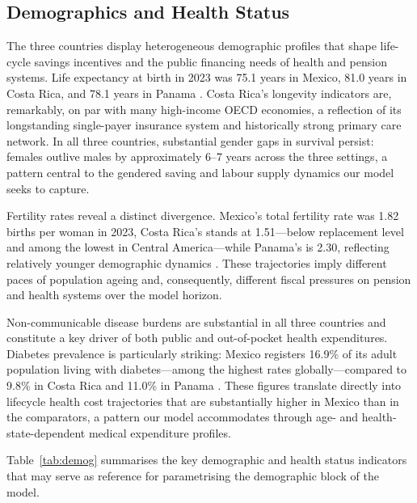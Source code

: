 \documentclass[12pt,a4paper]{article}
\begin{document}
\subsection{Demographics and Health Status}\label{subsec:demog}

The three countries display heterogeneous demographic profiles that
shape life-cycle savings incentives and the public financing needs of
health and pension systems. Life expectancy at birth in 2023 was 75.1
years in Mexico, 81.0 years in Costa Rica, and 78.1 years in Panama
\citep{PAHOHIA2024, WHOGHO2024}. Costa Rica's longevity indicators are,
remarkably, on par with many high-income OECD economies, a reflection
of its longstanding single-payer insurance system and historically
strong primary care network. In all three countries, substantial gender
gaps in survival persist: females outlive males by approximately 6--7
years across the three settings, a pattern central to the gendered
saving and labour supply dynamics our model seeks to capture.

Fertility rates reveal a distinct divergence. Mexico's total fertility
rate was 1.82 births per woman in 2023, Costa Rica's stands at
1.51---below replacement level and among the lowest in Central
America---while Panama's is 2.30, reflecting relatively younger
demographic dynamics \citep{WorldBankWDI2024}. These trajectories imply
different paces of population ageing and, consequently, different
fiscal pressures on pension and health systems over the model horizon.

Non-communicable disease burdens are substantial in all three countries
and constitute a key driver of both public and out-of-pocket health
expenditures. Diabetes prevalence is particularly striking: Mexico
registers 16.9\% of its adult population living with diabetes---among
the highest rates globally---compared to 9.8\% in Costa Rica and
11.0\% in Panama \citep{OECDHaG2023}. These figures translate directly
into lifecycle health cost trajectories that are substantially higher
in Mexico than in the comparators, a pattern our model accommodates
through age- and health-state-dependent medical expenditure profiles.

Table~\ref{tab:demog} summarises the key demographic and health status
indicators that may serve as reference for parametrising the
demographic block of the model.
\end{document}
